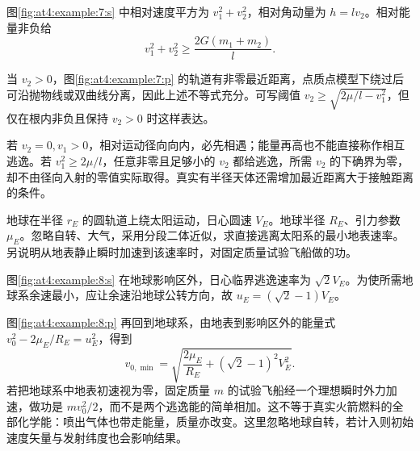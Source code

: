 \begin{solution}
图\ref{fig:at4:example:7:s} 中相对速度平方为 $v_1^2+v_2^2$，相对角动量为 $h=lv_2$。相对能量非负给
\[v_1^2+v_2^2\ge\frac{2G(m_1+m_2)}l.
\]

当 $v_2>0$，图\ref{fig:at4:example:7:p} 的轨道有非零最近距离，点质点模型下绕过后可沿抛物线或双曲线分离，因此上述不等式充分。可写阈值 $v_2\ge\sqrt{2\mu/l-v_1^2}$，但仅在根内非负且保持 $v_2>0$ 时这样表达。

若 $v_2=0,v_1>0$，相对运动径向向内，必先相遇；能量再高也不能直接称作相互逃逸。若 $v_1^2\ge2\mu/l$，任意非零且足够小的 $v_2$ 都给逃逸，所需 $v_2$ 的下确界为零，却不由径向入射的零值实际取得。真实有半径天体还需增加最近距离大于接触距离的条件。\end{solution}
\begin{question}\begin{example}[从地球表面直接逃离太阳系]\label{at4:example:8}
地球在半径 $r_E$ 的圆轨道上绕太阳运动，日心圆速 $V_E$。地球半径 $R_E$、引力参数 $\mu_E$。忽略自转、大气，采用分段二体近似，求直接逃离太阳系的最小地表速率。另说明从地表静止瞬时加速到该速率时，对固定质量试验飞船做的功。
\end{example}
\end{question}
\begin{solution}
图\ref{fig:at4:example:8:s} 在地球影响区外，日心临界逃逸速率为 $\sqrt2V_E$。为使所需地球系余速最小，应让余速沿地球公转方向，故 $u_E=(\sqrt2-1)V_E$。

图\ref{fig:at4:example:8:p} 再回到地球系，由地表到影响区外的能量式 $v_0^2-2\mu_E/R_E=u_E^2$，得到
\[v_{0,\min}=\sqrt{\frac{2\mu_E}{R_E}+(\sqrt2-1)^2V_E^2}.
\]
若把地球系中地表初速视为零，固定质量 $m$ 的试验飞船经一个理想瞬时外力加速，做功是 $mv_0^2/2$，而不是两个逃逸能的简单相加。这不等于真实火箭燃料的全部化学能：喷出气体也带走能量，质量亦改变。这里忽略地球自转，若计入则初始速度矢量与发射纬度也会影响结果。\end{solution}
